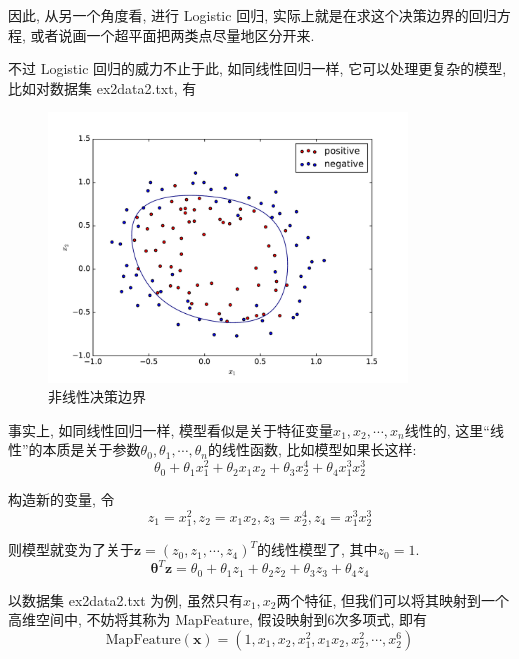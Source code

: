 \documentclass[a4paper,UTF8]{ctexart}
\theoremstyle{plain} \newtheorem{theorem}{定理}[section]
\theoremstyle{plain} \newtheorem{definition}{定义}[section]
\theoremstyle{plain} \newtheorem{lemma}{引理}[section]
\theoremstyle{plain} \newtheorem{proposition}{命题}[section]
\theoremstyle{plain} \newtheorem{example}{例}[section]
\theoremstyle{plain} \newtheorem{remark}{注}[section]
\theoremstyle{plain} \newtheorem{corollary}{推论}[section]
\begin{document}
因此, 从另一个角度看, 进行 Logistic 回归, 实际上就是在求这个决策边界的回归方程, 或者说画一个超平面把两类点尽量地区分开来.

不过 Logistic 回归的威力不止于此, 如同线性回归一样, 它可以处理更复杂的模型, 比如对数据集 ex2data2.txt, 有
\begin{figure}[!htb]
	\centering
	\includegraphics[width=0.85\textwidth]{ex2data2.pdf}
	\caption{非线性决策边界}
	\label{ex2data2}
\end{figure}

事实上, 如同线性回归一样, 模型看似是关于特征变量$x_{1}, x_{2}, \cdots, x_{n}$线性的, 这里“线性”的本质是关于参数$\theta_{0},\theta_{1},\cdots,\theta_{n}$的线性函数, 比如模型如果长这样:
\begin{equation*}
\theta_{0} + \theta_{1} x_{1}^{2} + \theta_{2} x_{1} x_{2} + \theta_{3} x_{2}^{4} + \theta_{4} x_{1}^{3} x_{2}^{3}
\end{equation*}

构造新的变量, 令
\begin{equation*}
z_{1} = x_{1}^{2}, z_{2} = x_{1} x_{2}, z_{3} = x_{2}^{4}, z_{4} = x_{1}^{3} x_{2}^{3}
\end{equation*}

则模型就变为了关于$\bm{z} = (z_{0},z_{1},\cdots,z_{4})^{T}$的线性模型了, 其中$z_{0} = 1$.
\begin{equation*}
\bm{\theta}^{T} \bm{z} = \theta_{0} + \theta_{1} z_{1} + \theta_{2}z_{2} + \theta_{3} z_{3} + \theta_{4} z_{4}
\end{equation*}

以数据集 ex2data2.txt 为例, 虽然只有$x_{1},x_{2}$两个特征, 但我们可以将其映射到一个高维空间中, 不妨将其称为 MapFeature, 假设映射到$6$次多项式, 即有
\begin{equation*}
\textrm{MapFeature}(\bm{x}) = (1, x_{1}, x_{2}, x_{1}^{2}, x_{1} x_{2}, x_{2}^{2}, \cdots, x_{2}^{6})
\end{equation*}
\end{document}
